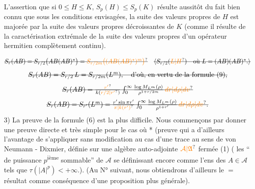 L'assertion que si $0\leq H\leq K$,  
$S_p(H)\leq S_p(K)$ résulte aussitôt du fait
bien connu que sous les conditions envisagées,
la suite des valeurs propres  de $H$ est majorée
par la suite des valeurs propres décroissantes
de $K$  (comme il résulte de la caractérisation extrémale   de la suite des valeurs
propres d'un opérateur hermitien complètement continu).

\[
\deleted{S_r(AB)=S_{r/2}\bigl(AB(AB)^*\bigr)=
\unsure{S_{r/2m}\bigl((AB(AB)^*)^m\bigr)}}\quad
\deleted{\inserted{S_{r/2}(\unsure{L|H})\quad\text{où }L=(AB)(AB)^*.}}
\]
\[
\deleted{S_r(AB)=S_{r/2}\,L=S_{r/2m}(L^m),\quad\text{d'où, en vertu de la formule (9),}}
\]
\[
\deleted{S_r(AB)=\frac{\unsure{r'}}{k(\unsure{r/2|r'})}\int_0^\infty
\frac{\log M_{L^m}(\rho)}{\rho^{1+r/2m}}\,\unsure{dr|d\rho|dv}}
\]
\[
\deleted{S_r(AB)=S_{r'}(L^m)=\frac{r'\sin\pi r'}{\unsure{\pi|k(r')}}
\int_0^\infty\frac{\log M_{L^m}(\rho)}{\rho^{1+r'}}\,\unsure{dr|d\rho|dv}.}
\]
3) La preuve de la formule (6) est la plus difficile.
Nous commençons par donner une
preuve directe et très simple pour le cas où
  *
(preuve qui a d'ailleurs l'avantage
de  s'appliquer sans modification au cas d'une
trace  au sens de von Neumann - Dixmier, définie
sur une algèbre auto-adjointe $\unsure{\mathcal A|\mathfrak A}$ 
  fermée 
(1) (  les ``  de puissance
$p$\textsuperscript{ième} sommable'' de $\mathcal A$ 
se définissant encore
comme l'ens des $A\in\mathcal A$ tels que
$\tau(|A|^p)<+\infty$.)\unsure{\textsuperscript{*}}.
(Au N° suivant, nous
obtiendrons d'ailleurs le $=$ résultat comme
conséquence d'une proposition plus générale).

